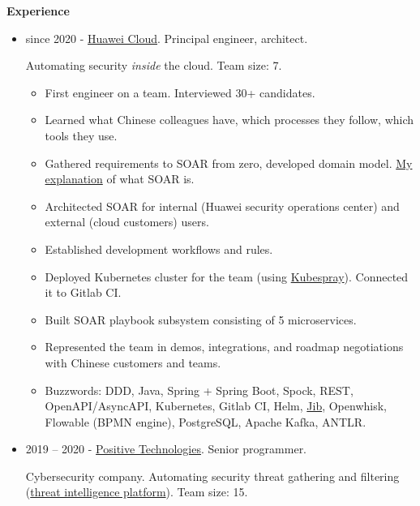 \documentclass[final]{letter}
\begin{document}
{\bf Experience}
\begin{itemize}
  \item since 2020 - \href{https://www.huaweicloud.com/en-us/}{Huawei Cloud}. Principal engineer, architect.

  Automating security \textit{inside} the cloud. Team size: 7.

  \begin{itemize}
    \item First engineer on a team. Interviewed 30+ candidates.
    \item Learned what Chinese colleagues have, which processes they follow, which tools they use.
    \item Gathered requirements to SOAR from zero, developed domain model. \href{https://neexee.github.io/posts-en/what-is-soar/}{My explanation} of what SOAR is.
    \item Architected SOAR for internal (Huawei security operations center) and external (cloud customers) users.
    \item Established development workflows and rules.
    \item Deployed Kubernetes cluster for the team (using \href{https://kubespray.io/}{Kubespray}). Connected it to Gitlab CI.
    \item Built SOAR playbook subsystem consisting of 5 microservices.
    \item Represented the team in demos, integrations, and roadmap negotiations with Chinese customers and teams.
    \item Buzzwords: DDD, Java, Spring + Spring Boot, Spock, REST, OpenAPI/AsyncAPI, Kubernetes, Gitlab CI, Helm, \href{https://github.com/GoogleContainerTools/jib}{Jib}, Openwhisk, Flowable (BPMN engine), PostgreSQL, Apache Kafka, ANTLR.
  \end{itemize}

  \item 2019 -- 2020 - \href{https://www.ptsecurity.com/ww-en/}{Positive Technologies}. Senior programmer.

  Cybersecurity company. Automating security threat gathering and filtering (\href{https://www.ptsecurity.com/ru-ru/products/cybersecurity-intelligence/}{threat intelligence platform}). Team size: 15.


\end{itemize}
\end{document}
